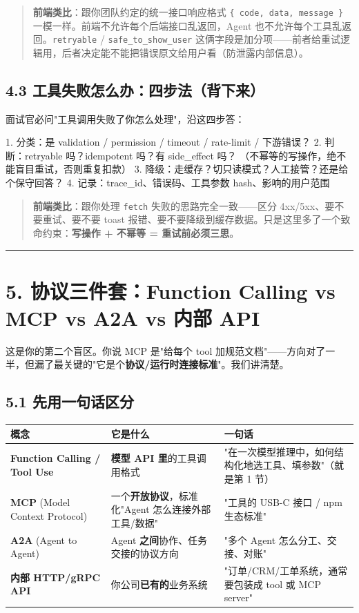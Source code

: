 \begin{quote}
 \textbf{前端类比}：跟你团队约定的统一接口响应格式 \texttt{\{ code, data, message \}} 一模一样。前端不允许每个后端接口乱返回，Agent 也不允许每个工具乱返回。\texttt{retryable} / \texttt{safe\_to\_show\_user} 这俩字段是加分项——前者给重试逻辑用，后者决定能不能把错误原文给用户看（防泄露内部信息）。
\end{quote}

\subsection{4.3 工具失败怎么办：四步法（背下来）}

面试官必问"工具调用失败了你怎么处理"，沿这四步答：

\begin{codeblock}
1. 分类：是 validation / permission / timeout / rate-limit / 下游错误？
2. 判断：retryable 吗？idempotent 吗？有 side_effect 吗？
         （不幂等的写操作，绝不能盲目重试，否则重复扣款）
3. 降级：走缓存？切只读模式？人工接管？还是给个保守回答？
4. 记录：trace_id、错误码、工具参数 hash、影响的用户范围
\end{codeblock}

\begin{quote}
 \textbf{前端类比}：跟你处理 \texttt{fetch} 失败的思路完全一致——区分 4xx/5xx、要不要重试、要不要 toast 报错、要不要降级到缓存数据。只是这里多了一个致命约束：\textbf{写操作 + 不幂等 = 重试前必须三思}。
\end{quote}

\bigskip\hrule\bigskip

\section{5. 协议三件套：Function Calling vs MCP vs A2A vs 内部 API}

这是你的第二个盲区。你说 MCP 是"给每个 tool 加规范文档"——方向对了一半，但漏了最关键的"它是个\textbf{协议/运行时连接标准}"。我们讲清楚。

\subsection{5.1 先用一句话区分}

\begingroup
\scriptsize
\setlength{\tabcolsep}{3pt}
\begin{longtable}{|p{}|p{}|p{}|}
\hline
概念 & 它是什么 & 一句话 \\ \hline
\textbf{Function Calling / Tool Use} & \textbf{模型 API 里}的工具调用格式 & "在一次模型推理中，如何结构化地选工具、填参数"（就是第 1 节） \\ \hline
\textbf{MCP} (Model Context Protocol) & 一个\textbf{开放协议}，标准化"Agent 怎么连接外部工具/数据" & "工具的 USB-C 接口 / npm 生态标准" \\ \hline
\textbf{A2A} (Agent to Agent) & Agent \textbf{之间}协作、任务交接的协议方向 & "多个 Agent 怎么分工、交接、对账" \\ \hline
\textbf{内部 HTTP/gRPC API} & 你公司\textbf{已有的}业务系统 & "订单/CRM/工单系统，通常要包装成 tool 或 MCP server" \\ \hline
\end{longtable}
\endgroup

